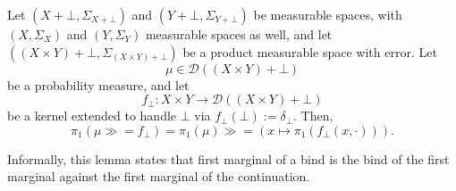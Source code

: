 \begin{lemma}\label{lem:bind-proj}
	Let $(X + \bot, \Sigma_{X + \bot})$ and $(Y + \bot, \Sigma_{Y + \bot})$ be measurable spaces, with $(X, \Sigma_X)$ and $(Y, \Sigma_Y)$ measurable spaces as well, and let $((X \times Y) + \bot, \Sigma_{(X \times Y) + \bot})$ be a product measurable space with error. Let
	\[
		\mu \in \mathcal{D}((X \times Y) + \bot)
	\]
	be a probability measure, and let 
	\[
		f_{\bot} : X \times Y \to \mathcal{D}((X \times Y) + \bot)
	\]
	be a kernel extended to handle $\bot$ via $f_\bot(\bot) := \delta_\bot$. Then,
	\[
		\pi_1(\mu \gg\!= f_{\bot}) = \pi_1(\mu) \gg\!= (x \mapsto \pi_1(f_{\bot}(x, \cdot))).
	\]
\end{lemma}

Informally, this lemma states that first marginal of a bind is the bind of the first marginal against the first marginal of the continuation.

